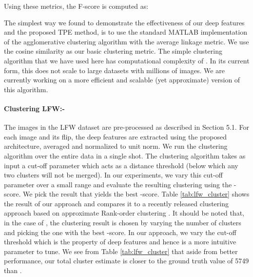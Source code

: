 \documentclass[10pt,twocolumn,letterpaper]{article}
\begin{document}
Using these metrics, the F-score is computed as:


The simplest way we found to demonstrate the effectiveness of our deep features
and the proposed TPE method, is to use the standard MATLAB implementation of the
agglomerative clustering algorithm with the average linkage metric. We use the
cosine similarity as our basic clustering metric. The simple clustering
algorithm that we have used here has computational complexity of
. In its current form, this does not scale to large datasets with
millions of images. We are currently working on a more efficient and scalable (yet approximate) version of this algorithm.

\paragraph{Clustering LFW:-}The images in the LFW dataset are pre-processed as described in Section 5.1. For each image and its flip, the deep features are extracted using the proposed architecture, averaged and normalized to unit  norm. We run the clustering algorithm over the entire data in a single shot. The clustering algorithm takes as input a cut-off parameter which acts as a distance threshold (below which any two clusters will not be merged). In our experiments, we vary this cut-off parameter over a small range and evaluate the
resulting clustering using the -score. We pick the result that yields the
best -score. Table \ref{tab:lfw_cluster} shows the result of our approach
and compares it to a recently released clustering approach based on approximate
Rank-order clustering \cite{msu_cluster}. It should be noted that, in the case
of \cite{msu_cluster}, the clustering result is chosen by varying the number of
clusters and picking the one with the best -score. In our approach, we vary
the cut-off threshold which is the property of deep features and hence is a
more intuitive parameter to tune. We see from Table \ref{tab:lfw_cluster} that
aside from better performance, our total cluster estimate is closer to the
ground truth value of 5749 than \cite{msu_cluster}.
\end{document}
